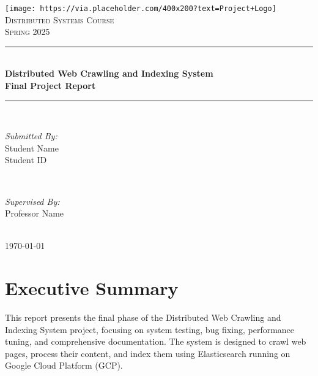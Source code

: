 \documentclass[12pt,a4paper]{report}
\begin{document}
\begin{titlepage}
    \centering
    \vspace*{1cm}
    \texttt{[image: https://via.placeholder.com/400x200?text=Project+Logo]}\\[1cm]
    
    \textsc{\LARGE Distributed Systems Course}\\[0.5cm]
    \textsc{\Large Spring 2025}\\[0.5cm]
    
    \rule{\linewidth}{0.2mm}\\[0.4cm]
    { \huge \bfseries Distributed Web Crawling and Indexing System\\
    Final Project Report}\\
    \rule{\linewidth}{0.2mm}\\[1.5cm]
    
    \begin{minipage}{0.4\textwidth}
        \begin{flushleft} \large
            \emph{Submitted By:}\\
            Student Name\\
            Student ID
        \end{flushleft}
    \end{minipage}~
    \begin{minipage}{0.4\textwidth}
        \begin{flushright} \large
            \emph{Supervised By:} \\
            Professor Name
        \end{flushright}
    \end{minipage}\\[2cm]
    
    {\large \today}
    
    \vfill
\end{titlepage}

\tableofcontents
\listoffigures
\listoftables

\chapter{Executive Summary}

This report presents the final phase of the Distributed Web Crawling and Indexing System project, focusing on system testing, bug fixing, performance tuning, and comprehensive documentation. The system is designed to crawl web pages, process their content, and index them using Elasticsearch running on Google Cloud Platform (GCP).
\end{document}
